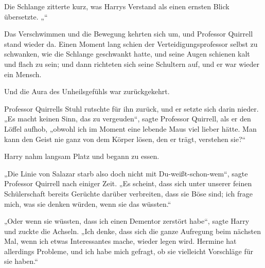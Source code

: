 Die Schlange zitterte kurz, was Harrys Verstand als einen ernsten Blick übersetzte. „“

Das Verschwimmen und die Bewegung kehrten sich um, und Professor Quirrell stand wieder da. Einen Moment lang schien der Verteidigungsprofessor selbst zu schwanken, wie die Schlange geschwankt hatte, und seine Augen schienen kalt und flach zu sein; und dann richteten sich seine Schultern auf, und er war wieder ein Mensch.

Und die Aura des Unheilsgefühls war zurückgekehrt.

Professor Quirrells Stuhl rutschte für ihn zurück, und er setzte sich darin nieder.
„Es macht keinen Sinn, das zu vergeuden“, sagte Professor Quirrell, als er den Löffel aufhob, „obwohl ich im Moment eine lebende Maus viel lieber hätte. Man kann den Geist nie ganz von dem Körper lösen, den er trägt, verstehen sie?“

Harry nahm langsam Platz und begann zu essen.

\later

„Die Linie von Salazar starb also doch nicht mit Du-weißt-schon-wem“, sagte Professor Quirrell nach einiger Zeit.
„Es scheint, dass sich unter unserer feinen Schülerschaft bereits Gerüchte darüber verbreiten, dass sie Böse sind; ich frage mich, was sie denken würden, wenn sie das wüssten.“

„Oder wenn sie wüssten, dass ich einen Dementor zerstört habe“, sagte Harry und zuckte die Achseln.
„Ich denke, dass sich die ganze Aufregung beim nächsten Mal, wenn ich etwas Interessantes mache, wieder legen wird. Hermine hat allerdings Probleme, und ich habe mich gefragt, ob sie vielleicht Vorschläge für sie haben.“

